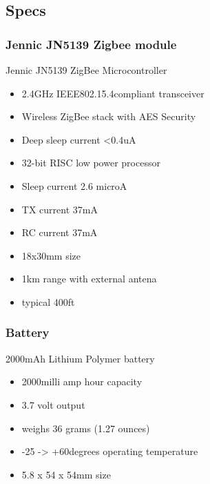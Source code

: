 \documentclass{article}
\begin{document}
\subsection{Specs}
\subsubsection{Jennic JN5139 Zigbee module}
Jennic JN5139 ZigBee Microcontroller
\begin{itemize}
\item 2.4GHz IEEE802.15.4compliant transceiver
\item Wireless ZigBee stack with AES Security
\item Deep sleep current <0.4uA
\item 32-bit RISC low power processor
\item Sleep current 2.6 microA
\item TX current 37mA
\item RC current 37mA
\item 18x30mm size
\item 1km range with external antena
\item typical 400ft
\end{itemize}

\subsubsection{Battery}
2000mAh Lithium Polymer battery
\begin{itemize}
\item 2000milli amp hour capacity
\item 3.7 volt output
\item weighs 36 grams (1.27 ounces)
\item -25 -> +60degrees operating temperature
\item 5.8 x 54 x 54mm size
\end{itemize}
\end{document}
